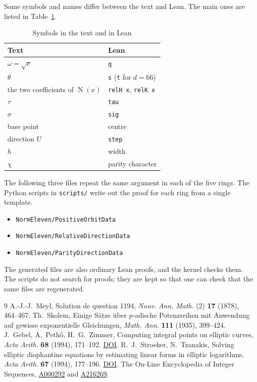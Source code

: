 \documentclass[a4paper,11pt]{article}
\theoremstyle{plain}
\theoremstyle{definition}
\theoremstyle{remark}
\numberwithin{equation}{section}
\numberwithin{table}{section}
\newcommand{\Nm}{\operatorname{N}}
\begin{document}
Some symbols and names differ between the text and Lean. The main ones are listed in Table~\ref{tab:names}.

\begin{table}[htbp]
\centering
\small
\caption{Symbols in the text and in Lean}\label{tab:names}
\begin{tabular}{ll}
\toprule
Text & Lean\\
\midrule
$\omega=\sqrt e$ & \texttt{q}\\
$\theta$ & \texttt{s} (\texttt{t} for $d=66$)\\
the two coefficients of $\Nm(x)$ & \texttt{relH x}, \texttt{relK x}\\
$\tau$ & \texttt{tau}\\
$\sigma$ & \texttt{sig}\\
base point & centre\\
direction $U$ & \texttt{step}\\
$h$ & width\\
$\chi$ & parity character\\
\bottomrule
\end{tabular}
\end{table}

The following three files repeat the same argument in each of the five rings. The Python scripts in \texttt{scripts/} write out the proof for each ring from a single template.
\begin{itemize}
\item \texttt{NormEleven/PositiveOrbitData}
\item \texttt{NormEleven/RelativeDirectionData}
\item \texttt{NormEleven/ParityDirectionData}
\end{itemize}
The generated files are also ordinary Lean proofs, and the kernel checks them.
The scripts do not search for proofs; they are kept so that one can check that the same files are regenerated.

\begin{thebibliography}{9}
 A.-J.-J.~Meyl, Solution de question 1194, \emph{Nouv. Ann. Math.} (2) \textbf{17} (1878), 464--467.
 Th.~Skolem, Einige S\"atze \"uber $p$-adische Potenzreihen mit Anwendung auf gewisse exponentielle Gleichungen, \emph{Math. Ann.} \textbf{111} (1935), 399--424.
 J.~Gebel, A.~Peth\H{o}, H.~G.~Zimmer, Computing integral points on elliptic curves, \emph{Acta Arith.} \textbf{68} (1994), 171--192. \href{https://doi.org/10.4064/aa-68-2-171-192}{DOI}.
 R.~J.~Stroeker, N.~Tzanakis, Solving elliptic diophantine equations by estimating linear forms in elliptic logarithms, \emph{Acta Arith.} \textbf{67} (1994), 177--196. \href{https://doi.org/10.4064/aa-67-2-177-196}{DOI}.
 The On-Line Encyclopedia of Integer Sequences, \href{https://oeis.org/A000292}{A000292} and \href{https://oeis.org/A216269}{A216269}.
\end{thebibliography}
\end{document}
